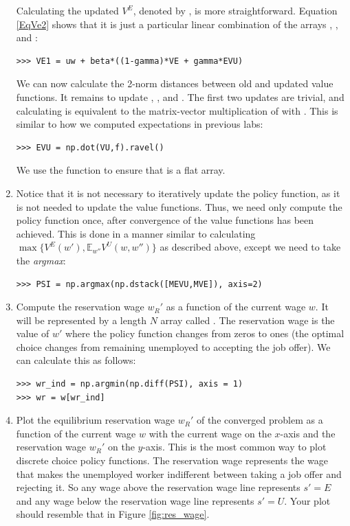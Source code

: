 \begin{problem}
\begin{enumerate}
   Calculating the updated $V^E$, denoted by , is more straightforward. 
   Equation \eqref{EqVe2} shows that it is just
   a particular linear combination of the arrays , , and :
   \begin{lstlisting}
>>> VE1 = uw + beta*((1-gamma)*VE + gamma*EVU)
   \end{lstlisting}
   
   We can now calculate the 2-norm distances between old and updated value functions. 
   It remains to update , , and .
   The first two updates are trivial, and calculating  is equivalent to the
   matrix-vector multiplication of  with . This is similar to how we computed
   expectations in previous labs:
   \begin{lstlisting}
>>> EVU = np.dot(VU,f).ravel()
   \end{lstlisting}
   We use the  function to ensure that  is a flat array.
   
   \item Notice that it is not necessary to iteratively update the policy function, as it is not needed
   to update the value functions. Thus, we need only compute the policy function once, after convergence
   of the value functions has been achieved. This is done in a manner similar to calculating
   $\max\{V^E(w'), \mathbb{E}_{w''}V^U(w,w'')\}$ as described above, except we need to take the \emph{argmax}:
\begin{lstlisting}
>>> PSI = np.argmax(np.dstack([MEVU,MVE]), axis=2)
\end{lstlisting}

   \item Compute the reservation wage $w_R'$ as a function of the current wage $w$. It will be represented
   by a length $N$ array called . The reservation wage is the
   value of $w'$ where the policy function changes from zeros to ones (the optimal choice changes from remaining
   unemployed to accepting the job offer). We can calculate this as follows:
   \begin{lstlisting}
>>> wr_ind = np.argmin(np.diff(PSI), axis = 1)
>>> wr = w[wr_ind]
   \end{lstlisting}

   \item Plot the equilibrium reservation wage $w_R'$ of the converged problem as a function of the current
   wage $w$ with the current wage on the $x$-axis and the reservation wage $w_R'$ on the $y$-axis. This is
   the most common way to plot discrete choice policy functions. The reservation wage represents the wage
   that makes the unemployed worker indifferent between taking a job offer and rejecting it. So any wage
   above the reservation wage line represents $s' = E$ and any wage below the reservation wage line represents
   $s' = U$. Your plot should resemble that in Figure \ref{fig:res_wage}.

\end{enumerate}
\end{problem}

